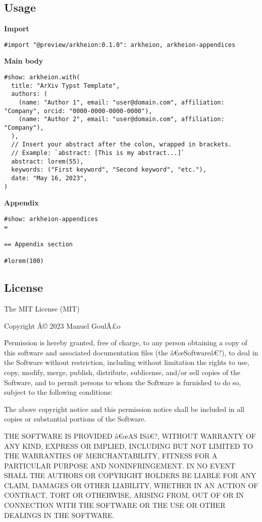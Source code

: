 \subsection{Usage}\label{usage}

\textbf{Import}

\begin{verbatim}
#import "@preview/arkheion:0.1.0": arkheion, arkheion-appendices
\end{verbatim}

\textbf{Main body}

\begin{verbatim}
#show: arkheion.with(
  title: "ArXiv Typst Template",
  authors: (
    (name: "Author 1", email: "user@domain.com", affiliation: "Company", orcid: "0000-0000-0000-0000"),
    (name: "Author 2", email: "user@domain.com", affiliation: "Company"),
  ),
  // Insert your abstract after the colon, wrapped in brackets.
  // Example: `abstract: [This is my abstract...]`
  abstract: lorem(55),
  keywords: ("First keyword", "Second keyword", "etc."),
  date: "May 16, 2023",
)
\end{verbatim}

\textbf{Appendix}

\begin{verbatim}
#show: arkheion-appendices
=

== Appendix section

#lorem(100)
\end{verbatim}

\subsection{License}\label{license}

The MIT License (MIT)

Copyright Â© 2023 Manuel GoulÃ£o

Permission is hereby granted, free of charge, to any person obtaining a
copy of this software and associated documentation files (the
â€œSoftwareâ€?), to deal in the Software without restriction, including
without limitation the rights to use, copy, modify, merge, publish,
distribute, sublicense, and/or sell copies of the Software, and to
permit persons to whom the Software is furnished to do so, subject to
the following conditions:

The above copyright notice and this permission notice shall be included
in all copies or substantial portions of the Software.

THE SOFTWARE IS PROVIDED â€œAS ISâ€?, WITHOUT WARRANTY OF ANY KIND,
EXPRESS OR IMPLIED, INCLUDING BUT NOT LIMITED TO THE WARRANTIES OF
MERCHANTABILITY, FITNESS FOR A PARTICULAR PURPOSE AND NONINFRINGEMENT.
IN NO EVENT SHALL THE AUTHORS OR COPYRIGHT HOLDERS BE LIABLE FOR ANY
CLAIM, DAMAGES OR OTHER LIABILITY, WHETHER IN AN ACTION OF CONTRACT,
TORT OR OTHERWISE, ARISING FROM, OUT OF OR IN CONNECTION WITH THE
SOFTWARE OR THE USE OR OTHER DEALINGS IN THE SOFTWARE.

